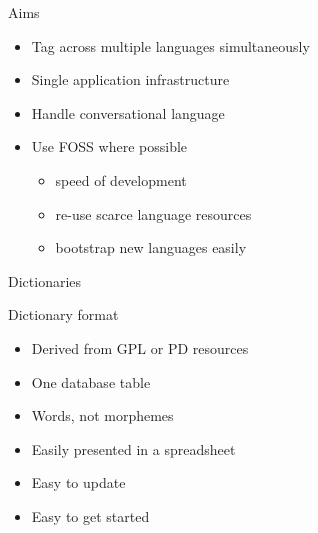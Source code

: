\documentclass[hyperref={pdfpagelabels=false}, 14pt]{beamer}
\begin{document}
\begin{frame}{Aims}
\begin{itemize}
\item Tag across multiple languages simultaneously
\item Single application infrastructure
\item Handle conversational language
\item Use FOSS where possible
\begin{itemize}
    \item speed of development
    \item re-use scarce language resources
    \item bootstrap new languages easily
\end{itemize}
\end{itemize}
\end{frame}


\begin{frame}{}
\begin{center}
\begin{huge} \textcolor{ESRCred}{Dictionaries} \end{huge}
\end{center}
\end{frame}


\begin{frame}{Dictionary format}
\begin{itemize}
\item Derived from GPL or PD resources
\item One database table
\item Words, not morphemes
\item Easily presented in a spreadsheet
\item Easy to update
\item Easy to get started
\end{itemize}
\end{frame}
\end{document}
